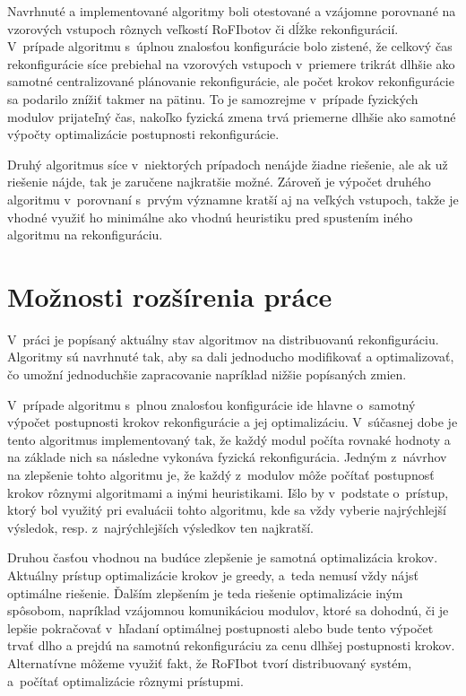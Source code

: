 \documentclass[
  printed, %
  oneside, %
  notable,   %
  nolof,     %
  nolot,     %
]{fithesis3}
\begin{document}
Navrhnuté a implementované algoritmy boli otestované a vzájomne porovnané na vzorových vstupoch rôznych veľkostí RoFIbotov či dĺžke rekonfigurácií. V~prípade algoritmu s~úplnou znalosťou konfigurácie bolo zistené, že celkový čas rekonfigurácie síce prebiehal na vzorových vstupoch v~priemere trikrát dlhšie ako samotné centralizované plánovanie rekonfigurácie, ale počet krokov rekonfigurácie sa podarilo znížiť takmer na pätinu. To je samozrejme v~prípade fyzických modulov prijateľný čas, nakoľko fyzická zmena trvá priemerne dlhšie ako samotné výpočty optimalizácie postupnosti rekonfigurácie. 

Druhý algoritmus síce v~niektorých prípadoch nenájde žiadne riešenie, ale ak už riešenie nájde, tak je zaručene najkratšie možné. Zároveň je výpočet druhého algoritmu v~porovnaní s~prvým významne kratší aj na veľkých vstupoch, takže je vhodné využiť ho minimálne ako vhodnú heuristiku pred spustením iného algoritmu na rekonfiguráciu. 

\section{Možnosti rozšírenia práce}
\label{sec:future}
V~práci je popísaný aktuálny stav algoritmov na distribuovanú rekonfiguráciu. Algoritmy sú navrhnuté tak, aby sa dali jednoducho modifikovať a optimalizovať, čo umožní jednoduchšie zapracovanie napríklad nižšie popísaných zmien. 

V~prípade algoritmu s~plnou znalosťou konfigurácie ide hlavne o~samotný výpočet postupnosti krokov rekonfigurácie a jej optimalizáciu. V~súčasnej dobe je tento algoritmus implementovaný tak, že každý modul počíta rovnaké hodnoty a na základe nich sa následne vykonáva fyzická rekonfigurácia. Jedným z~návrhov na zlepšenie tohto algoritmu je, že každý z~modulov môže počítať postupnosť krokov rôznymi algoritmami a inými heuristikami. Išlo by v~podstate o~prístup, ktorý bol využitý pri evaluácii tohto algoritmu, kde sa vždy vyberie najrýchlejší výsledok, resp. z~najrýchlejších výsledkov ten najkratší. 

Druhou časťou vhodnou na budúce zlepšenie je samotná optimalizácia krokov. Aktuálny prístup optimalizácie krokov je greedy, a~teda nemusí vždy nájsť optimálne riešenie. Ďalším zlepšením je teda riešenie optimalizácie iným spôsobom, napríklad vzájomnou komunikáciou modulov, ktoré sa dohodnú, či je lepšie pokračovať v~hľadaní optimálnej postupnosti alebo bude tento výpočet trvať dlho a prejdú na samotnú rekonfiguráciu za cenu dlhšej postupnosti krokov. Alternatívne môžeme využiť fakt, že RoFIbot tvorí distribuovaný systém, a~počítať optimalizácie rôznymi prístupmi. 
\end{document}
